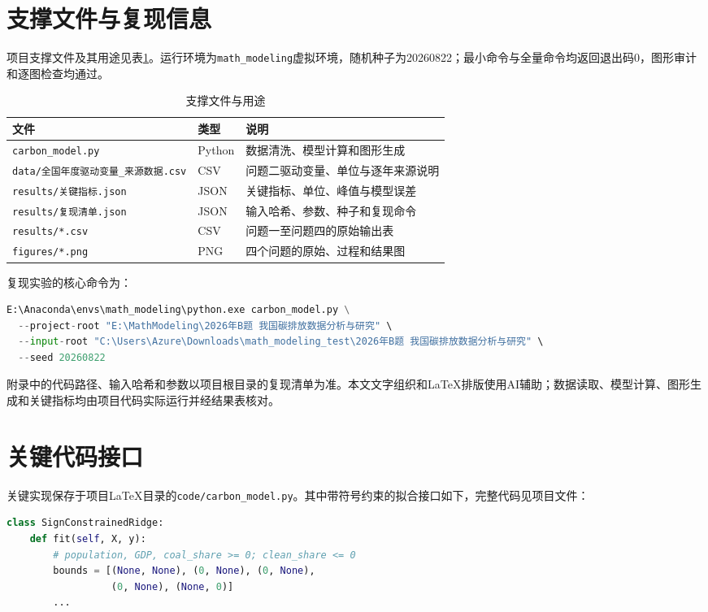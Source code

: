 \documentclass[12pt,a4paper]{ctexart}
\theoremstyle{definition}
\theoremstyle{plain}
\theoremstyle{remark}
\begin{document}
\section{支撑文件与复现信息}
项目支撑文件及其用途见表\ref{tab:support}。运行环境为\texttt{math\_modeling}虚拟环境，随机种子为20260822；最小命令与全量命令均返回退出码0，图形审计和逐图检查均通过。

\begin{table}[H]
\centering
\caption{支撑文件与用途}
\label{tab:support}
\begin{tabular}{>{\raggedright\arraybackslash}p{4.3cm}>{\centering\arraybackslash}p{1.2cm}>{\raggedright\arraybackslash}p{5.3cm}}
\toprule
文件 & 类型 & 说明\\
\midrule
\texttt{carbon\_model.py} & Python & 数据清洗、模型计算和图形生成\\
\texttt{data/全国年度驱动变量\_来源数据.csv} & CSV & 问题二驱动变量、单位与逐年来源说明\\
\texttt{results/关键指标.json} & JSON & 关键指标、单位、峰值与模型误差\\
\texttt{results/复现清单.json} & JSON & 输入哈希、参数、种子和复现命令\\
\texttt{results/*.csv} & CSV & 问题一至问题四的原始输出表\\
\texttt{figures/*.png} & PNG & 四个问题的原始、过程和结果图\\
\bottomrule
\end{tabular}
\end{table}

复现实验的核心命令为：
\begin{lstlisting}[language=Python, caption={模型复现实行命令}, label={lst:reproduce}]
E:\Anaconda\envs\math_modeling\python.exe carbon_model.py \
  --project-root "E:\MathModeling\2026年B题 我国碳排放数据分析与研究" \
  --input-root "C:\Users\Azure\Downloads\math_modeling_test\2026年B题 我国碳排放数据分析与研究" \
  --seed 20260822
\end{lstlisting}
附录中的代码路径、输入哈希和参数以项目根目录的复现清单为准。本文文字组织和LaTeX排版使用AI辅助；数据读取、模型计算、图形生成和关键指标均由项目代码实际运行并经结果表核对。

\section{关键代码接口}
关键实现保存于项目LaTeX目录的\texttt{code/carbon\_model.py}。其中带符号约束的拟合接口如下，完整代码见项目文件：
\begin{lstlisting}[language=Python, caption={带符号约束岭回归接口}, label={lst:ridge}]
class SignConstrainedRidge:
    def fit(self, X, y):
        # population, GDP, coal_share >= 0; clean_share <= 0
        bounds = [(None, None), (0, None), (0, None),
                  (0, None), (None, 0)]
        ...
\end{lstlisting}
\end{document}
